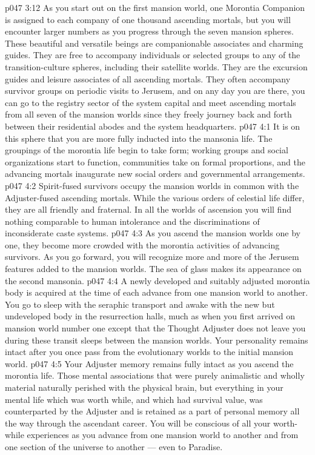 \vs p047 3:12 As you start out on the first mansion world, one Morontia Companion is assigned to each company of one thousand ascending mortals, but you will encounter larger numbers as you progress through the seven mansion spheres. These beautiful and versatile beings are companionable associates and charming guides. They are free to accompany individuals or selected groups to any of the transition\hyp{}culture spheres, including their satellite worlds. They are the excursion guides and leisure associates of all ascending mortals. They often accompany survivor groups on periodic visits to Jerusem, and on any day you are there, you can go to the registry sector of the system capital and meet ascending mortals from all seven of the mansion worlds since they freely journey back and forth between their residential abodes and the system headquarters.
\vs p047 4:1 It is on this sphere that you are more fully inducted into the mansonia life. The groupings of the morontia life begin to take form; working groups and social organizations start to function, communities take on formal proportions, and the advancing mortals inaugurate new social orders and governmental arrangements.
\vs p047 4:2 Spirit\hyp{}fused survivors occupy the mansion worlds in common with the Adjuster\hyp{}fused ascending mortals. While the various orders of celestial life differ, they are all friendly and fraternal. In all the worlds of ascension you will find nothing comparable to human intolerance and the discriminations of inconsiderate caste systems.
\vs p047 4:3 As you ascend the mansion worlds one by one, they become more crowded with the morontia activities of advancing survivors. As you go forward, you will recognize more and more of the Jerusem features added to the mansion worlds. The sea of glass makes its appearance on the second mansonia.
\vs p047 4:4 A newly developed and suitably adjusted morontia body is acquired at the time of each advance from one mansion world to another. You go to sleep with the seraphic transport and awake with the new but undeveloped body in the resurrection halls, much as when you first arrived on mansion world number one except that the Thought Adjuster does not leave you during these transit sleeps between the mansion worlds. Your personality remains intact after you once pass from the evolutionary worlds to the initial mansion world.
\vs p047 4:5 Your Adjuster memory remains fully intact as you ascend the morontia life. Those mental associations that were purely animalistic and wholly material naturally perished with the physical brain, but everything in your mental life which was worth while, and which had survival value, was counterparted by the Adjuster and is retained as a part of personal memory all the way through the ascendant career. You will be conscious of all your worth\hyp{}while experiences as you advance from one mansion world to another and from one section of the universe to another --- even to Paradise.
